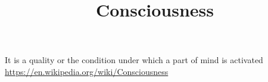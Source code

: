 \documentclass[a4paper]{article}
\title{Consciousness}
\date{}
\begin{document}
    \maketitle
    It is a quality or the condition under which a part of mind is activated
    \url{https://en.wikipedia.org/wiki/Consciousness}
\end{document}
